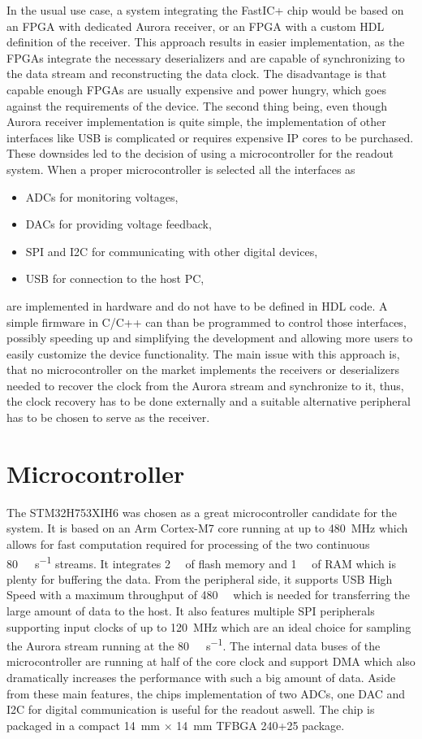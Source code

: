 In the usual use case, a system integrating the FastIC+ chip would be based on an FPGA with dedicated Aurora receiver, or an FPGA with a custom HDL definition of the receiver. This approach results in easier implementation, as the FPGAs integrate the necessary deserializers and are capable of synchronizing to the data stream and reconstructing the data clock. The disadvantage is that capable enough FPGAs are usually expensive and power hungry, which goes against the requirements of the device. The second thing being, even though Aurora receiver implementation is quite simple, the implementation of other interfaces like USB is complicated or requires expensive IP cores to be purchased. These downsides led to the decision of using a microcontroller for the readout system. 
When a proper microcontroller is selected all the interfaces as
\begin{itemize}
    \item ADCs for monitoring voltages,
    \item DACs for providing voltage feedback,
    \item SPI and I2C for communicating with other digital devices,
    \item USB for connection to the host PC,
\end{itemize}
are implemented in hardware and do not have to be defined in HDL code. A simple firmware in C/C++ can than be programmed to control those interfaces, possibly speeding up and simplifying the development and allowing more users to easily customize the device functionality. The main issue with this approach is, that no microcontroller on the market implements the receivers or deserializers needed to recover the clock from the Aurora stream and synchronize to it, thus, the clock recovery has to be done externally and a suitable alternative peripheral has to be chosen to serve as the receiver.

\section{Microcontroller}
The STM32H753XIH6 was chosen as a great microcontroller candidate for the system. It is based on an Arm Cortex-M7 core running at up to \SI{480}{\mega\hertz} which allows for fast computation required for processing of the two continuous \SI{80}{\mega\bit\per\second} streams. It integrates \SI{2}{\mega\byte} of flash memory and \SI{1}{\mega\byte} of RAM which is plenty for buffering the data. From the peripheral side, it supports USB High Speed with a maximum throughput of \SI{480}{\mega\bit} which is needed for transferring the large amount of data to the host. It also features multiple SPI peripherals supporting input clocks of up to \SI{120}{\mega\hertz} which are an ideal choice for sampling the Aurora stream running at the \SI{80}{\mega\bit\per\second}. The internal data buses of the microcontroller are running at half of the core clock and support DMA which also dramatically increases the performance with such a big amount of data. Aside from these main features, the chips implementation of two ADCs, one DAC and I2C for digital communication is useful for the readout aswell. The chip is packaged in a compact \SI{14}{\milli\meter} $\times$ \SI{14}{\milli\meter} TFBGA 240+25 package.

